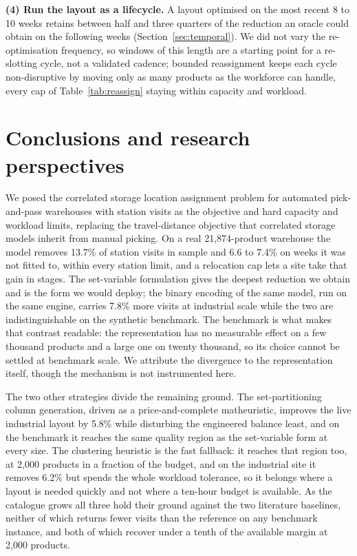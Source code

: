 \documentclass[]{interact}
\begin{document}
\textbf{(4) Run the layout as a lifecycle.} A layout optimised on the most recent 8 to 10 weeks retains between half and three quarters of the reduction an oracle could obtain on the following weeks (Section~\ref{sec:temporal}). We did not vary the re-optimisation frequency, so windows of this length are a starting point for a re-slotting cycle, not a validated cadence; bounded reassignment keeps each cycle non-disruptive by moving only as many products as the workforce can handle, every cap of Table~\ref{tab:reassign} staying within capacity and workload.

\section{Conclusions and research perspectives}\label{sec:conclusion}
We posed the correlated storage location assignment problem for automated pick-and-pass warehouses with station visits as the objective and hard capacity and workload limits, replacing the travel-distance objective that correlated storage models inherit from manual picking. On a real 21,874-product warehouse the model removes 13.7\% of station visits in sample and 6.6 to 7.4\% on weeks it was not fitted to, within every station limit, and a relocation cap lets a site take that gain in stages. The set-variable formulation gives the deepest reduction we obtain and is the form we would deploy; the binary encoding of the same model, run on the same engine, carries 7.8\% more visits at industrial scale while the two are indistinguishable on the synthetic benchmark. The benchmark is what makes that contrast readable: the representation has no measurable effect on a few thousand products and a large one on twenty thousand, so its choice cannot be settled at benchmark scale. We attribute the divergence to the representation itself, though the mechanism is not instrumented here.

The two other strategies divide the remaining ground. The set-partitioning column generation, driven as a price-and-complete matheuristic, improves the live industrial layout by 5.8\% while disturbing the engineered balance least, and on the benchmark it reaches the same quality region as the set-variable form at every size. The clustering heuristic is the fast fallback: it reaches that region too, at 2,000 products in a fraction of the budget, and on the industrial site it removes 6.2\% but spends the whole workload tolerance, so it belongs where a layout is needed quickly and not where a ten-hour budget is available. As the catalogue grows all three hold their ground against the two literature baselines, neither of which returns fewer visits than the reference on any benchmark instance, and both of which recover under a tenth of the available margin at 2,000 products.
\end{document}
